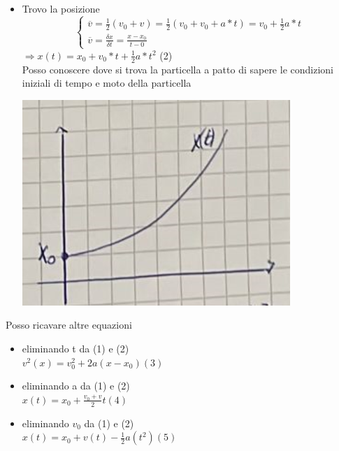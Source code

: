 \documentclass{report}
\begin{document}
\begin{itemize}
\begin{itemize}
\begin{itemize}
\begin{center}
                        \end{center}
                  \item Trovo la posizione\\
                        \begin{equation}
                          \begin{cases}
                            \overline{v}=\frac{1}{2}(v_0+v)=\frac{1}{2}(v_0+v_0+a*t)=v_0+\frac{1}{2}a*t \\
                            \overline{v}=\frac{\delta x}{\delta t}=\frac{x-x_0}{t-0}
                          \end{cases}
                        \end{equation}
                        $\Rightarrow x(t)=x_0+v_0*t+\frac{1}{2}a*t^2$ (2)\\
                        Posso conoscere dove si trova la particella a patto di sapere le condizioni iniziali di tempo e moto della particella\begin{center}
                          \includegraphics[scale=0.5]{grafico6.png}
                        \end{center}
                \end{itemize}
                Posso ricavare altre equazioni
                \begin{itemize}
                  \item eliminando t da (1) e (2)\\$v^2(x)=v_0^2+2a(x-x_0) (3)$
                  \item eliminando a da (1) e (2)\\$x(t)=x_0+\frac{v_0+v}{2}t (4)$
                  \item eliminando $v_0$ da (1) e (2)\\$x(t)=x_0+v(t)-\frac{1}{2}a(t^2) (5)$

\end{itemize}
\end{itemize}
\end{itemize}
\end{document}
